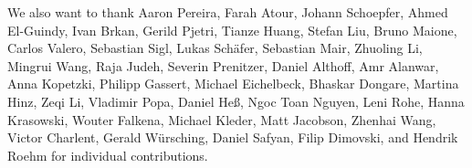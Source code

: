 We also want to thank Aaron Pereira, Farah Atour, Johann Schoepfer, Ahmed El-Guindy, Ivan Brkan, Gerild Pjetri, Tianze Huang, Stefan Liu, Bruno Maione, Carlos Valero, Sebastian Sigl, Lukas Schäfer, Sebastian Mair, Zhuoling Li, Mingrui Wang, Raja Judeh, Severin Prenitzer, Daniel Althoff, Amr Alanwar, Anna Kopetzki, Philipp Gassert, Michael Eichelbeck, Bhaskar Dongare, Martina Hinz, Zeqi Li, Vladimir Popa, Daniel Heß, Ngoc Toan Nguyen, Leni Rohe, Hanna Krasowski, Wouter Falkena, Michael Kleder, Matt Jacobson, Zhenhai Wang, Victor Charlent, Gerald Würsching, Daniel Safyan, Filip Dimovski, and Hendrik Roehm for individual contributions.



